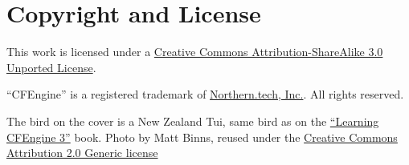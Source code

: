 \chapter{Copyright and License}

This work is licensed under a \href{http://creativecommons.org/licenses/by-sa/3.0/}{Creative Commons Attribution-ShareAlike 3.0 Unported License}.

``CFEngine'' is a registered trademark of \href{https://northern.tech/}{Northern.tech, Inc.}. All rights reserved.

The bird on the cover is a New Zealand Tui, same bird as on the \href{http://shop.oreilly.com/product/0636920022022.do}{``Learning CFEngine 3''} book. Photo by Matt Binns, reused under the \href{http://creativecommons.org/licenses/by/2.0/deed.en}{Creative Commons Attribution 2.0 Generic license}